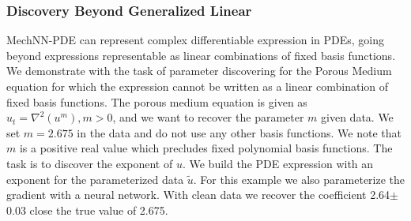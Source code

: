 \subsubsection{Discovery Beyond Generalized Linear}
MechNN-PDE can represent complex differentiable expression in PDEs, going beyond expressions representable as linear combinations of fixed basis functions.
We demonstrate with the task of parameter discovering for the Porous Medium equation for which the expression cannot be written as a linear combination of fixed basis functions.
The porous medium equation is given as $u_t = \nabla^2 (u^m),  m > 0$, and we want to recover the parameter $m$ given data.
We set $m=2.675$ in the data and do not use any other basis functions.
We note that $m$ is a positive real value which precludes fixed polynomial basis functions.
The task is to discover the exponent of $u$.
We build the PDE expression with an exponent for the parameterized data $\tilde{u}$.
For this example we also parameterize the gradient with a neural network.
With clean data we recover the coefficient 2.64$\pm$0.03 close the true value of 2.675.


